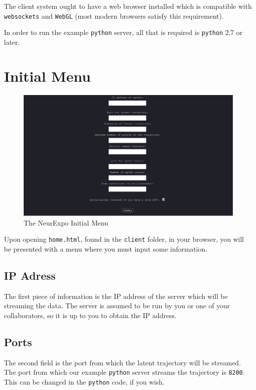 \documentclass[12pt, openany]{book}
\begin{document}
The client system ought to have a web browser installed which is compatible with \texttt{websockets} and \texttt{WebGL} (most modern browsers satisfy this requirement).

In order to run the example \texttt{python} server, all that is required is \texttt{python} 2.7 or later.

\chapter{Initial Menu}

\begin{figure}
  \includegraphics[width=\linewidth]{NeurExpo_Menu.png}
  \caption{The NeurExpo Initial Menu}
 \end{figure}

Upon opening \texttt{home.html}, found in the \texttt{client} folder, in your browser, you will be presented with a menu where you must input some information.

\section{IP Adress}

The first piece of information is the IP address of the server which will be streaming the data. The server is assumed to be run by you or one of your collaborators, so it is up to you to obtain the IP address.

\section{Ports}

The second field is the port from which the latent trajectory will be streamed. The port from which our example \texttt{python} server streams the trajectory is \texttt{8200}. This can be changed in the \texttt{python} code, if you wish.
\end{document}

